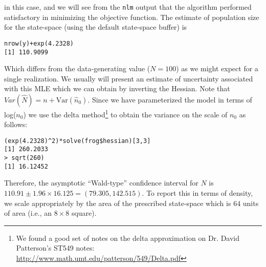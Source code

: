 in this case, and we will see from the \mbox{\tt nlm} output that the
algorithm performed satisfactory in minimizing the objective function.
The estimate of population size for the state-space (using the default 
state-space buffer) is
\begin{verbatim}
nrow(y)+exp(4.2328)
[1] 110.9099
\end{verbatim}
Which differs from the data-generating value ($N=100$) as we might
expect for a single realization. We usually will present an estimate of uncertainty associated
with this MLE which we can obtain by inverting the Hessian. Note that
$Var(\hat{N}) = n + \mbox{Var}(\hat{n}_{0})$.
Since we
have parameterized the model in terms of log($n_{0}$) we use the delta
method\footnote{
We found a good set of notes on the delta approximation on Dr. David
Patterson's ST549 notes: 
\url{http://www.math.umt.edu/patterson/549/Delta.pdf}
}
\citep[][Appendix F4]{williams_etal:2002}
 to obtain the variance on the scale of $n_{0}$ as
follows:
\begin{verbatim}
(exp(4.2328)^2)*solve(frog$hessian)[3,3]
[1] 260.2033
> sqrt(260)
[1] 16.12452
\end{verbatim}
Therefore, the asymptotic ``Wald-type'' confidence interval for $N$ is
$110.91 \pm 1.96 \times 16.125 = (79.305, 142.515)$. To report this in
terms of density, we scale appropriately by the area of the prescribed
state-space which is $64$ units of area (i.e., an $8 \times 8$ square).


\begin{comment}

\subsection{Exercises}

{\flushleft 
{\bf 1.}	
Run the analysis with different state-space buffers and comment on the result. 
}


{\flushleft 
{\bf 2.} Conduct a brief simulation study using this code by
  simulating 100 data sets and obtain the MLEs for each data set. Do
  things seem to be working as you expect?  }

{\flushleft 
{\bf 3.} 
Further extensions: It should be straightforward to
  generalize the integrated likelihood function to accommodate many
  different situations. For examples, if we want to include more
  covariates in the model we can just add stuff to the object \mbox{\tt probcap},
 and add the relevant parameters to the argument that gets
  passed to the main  function.  For the simulated data, make up a
  covariate by generating a Bernoulli covariate (``trap type'', perhaps
  baited or not baited) randomly and try to modify the likelihood to
  accommodate that.  }

{\flushleft {\bf 4.}  We would probably be interested in devising the
  integrated likelihood for the full 3-d encounter history array so
  that we could include temporally varying covariates. This is not
  difficult but naturally will slow down the execution
  substantially. The interested reader should try to expand the
  capabilities of this basic {\bf R} function.  }
\end{comment}





